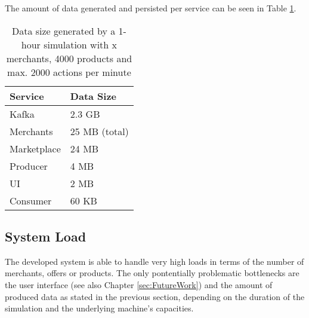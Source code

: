 The amount of data generated and persisted per service can be seen in Table \ref{table:generated_data}.

\begin{table}[]
\centering
\caption{Data size generated by a 1-hour simulation with x merchants, 4000 products and max. 2000 actions per minute}
\label{table:generated_data}
\begin{tabular}{|l|l|}
\hline
\textbf{Service} & \textbf{Data Size} \\ \hline
Kafka            & 2.3 GB             \\ \hline
Merchants        & 25 MB (total)      \\ \hline
Marketplace      & 24 MB              \\ \hline
Producer         & 4 MB               \\ \hline
UI               & 2 MB               \\ \hline
Consumer         & 60 KB              \\ \hline
\end{tabular}
\end{table}





\subsection{System Load}
\label{sec:system_evaluation}
%
The developed system is able to handle very high loads in terms of the number of merchants, offers or products. The only pontentially problematic bottlenecks are the user interface (see also Chapter \ref{sec:FutureWork}) and the amount of produced data as stated in the previous section, depending on the duration of the simulation and the underlying machine's capacities.  \\

